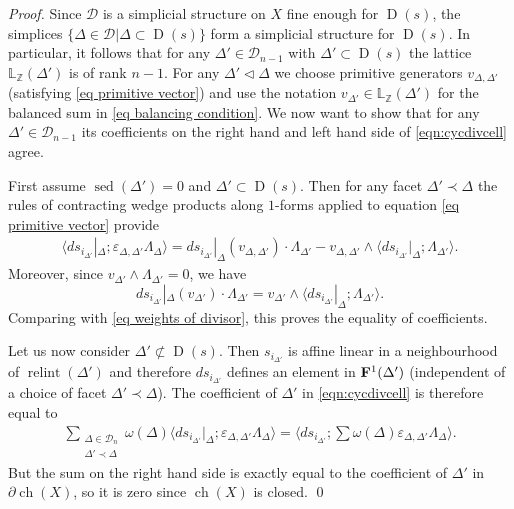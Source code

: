 \documentclass[11pt]{article}
\numberwithin{equation}{numsection}
\newcommand{\Z}{{\mathbb Z}}
\renewcommand{\D}{{\mathcal D}}
\newcommand{\Linear}{\mathbb{L}}
\newcommand{\DD}{\mathcal{D}}
\newcommand{\diff}{d}
\newcommand{\face}{\lhd}
\DeclareMathOperator{\relint}{relint}
\DeclareMathOperator{\sed}{sed}
\DeclareMathOperator{\ch}{ch}
\DeclareMathOperator{\ND}{D}
\begin{document}
\begin{proof}
Since $\DD$ is a simplicial structure on $X$ fine enough for $\ND(s)$, the simplices $\{\Delta \in \DD | \Delta \subset \ND(s)\}$
form a simplicial structure for $\ND(s)$. 
In particular, it follows that for any $\Delta' \in \DD_{n-1}$ with 
$\Delta' \subset \ND(s)$ the lattice $\Linear_{\Z}(\Delta')$ is of rank $n-1$. 
For any $\Delta' \face \Delta$ we choose primitive generators $v_{\Delta, \Delta'}$ (satisfying
\eqref{eq primitive vector}) and use the notation $v_{\Delta'} \in \Linear_{\Z}(\Delta')$ for the balanced sum in \eqref{eq balancing condition}.
We now want to show that for any $\Delta' \in \D_{n-1}$ its coefficients 
on the right hand and left hand side of \eqref{eqn:cycdivcell} agree.

First assume $\sed(\Delta') = 0$ and $\Delta' \subset \ND(s)$.
Then for any facet $\Delta' \prec \Delta$ 
the rules of contracting wedge products along $1$-forms 
applied to equation \eqref{eq primitive vector} provide
\begin{align}\label{eqn:contract}
\langle \diff s_{i_{\Delta'}}|_{\Delta}; \varepsilon_{\Delta, \Delta'} \Lambda_{\Delta} \rangle = 
\diff s_{i_{\Delta'}}|_{\Delta}(v_{\Delta, \Delta'}) \cdot \Lambda_{\Delta'} - 
 v_{\Delta, \Delta'} \wedge \langle \diff s_{i_{\Delta'}}|_{\Delta}; \Lambda_{\Delta'} \rangle.
\end{align}
Moreover, since $v_{\Delta'} \wedge \Lambda_{\Delta'} = 0$, we have
\[
  \diff s_{i_{\Delta'}}|_{\Delta}(v_{\Delta'}) \cdot \Lambda_{\Delta'} = 
v_{\Delta'} \wedge \langle \diff s_{i_{\Delta'}}|_{\Delta}; \Lambda_{\Delta'} \rangle.
\]
Comparing with \eqref{eq weights of divisor}, this proves the equality of coefficients.


Let us now consider $\Delta' \not\subset \ND(s)$. 
Then $s_{i_{\Delta'}}$ is affine linear in a neighbourhood of $\relint(\Delta')$ and 
therefore $\diff s_{i_{\Delta'}}$ defines an element
in ${\bf F}^1(\Delta')$ (independent of a choice of facet $\Delta' \prec \Delta$). 
The coefficient of $\Delta'$ in \eqref{eqn:cycdivcell} is therefore equal to 
\begin{align*}  
\sum_{\substack{\Delta \in \DD_{n} \\ \Delta' \prec \Delta}}
\omega(\Delta)  \langle \diff s_{i_{\Delta'}}|_{\Delta}; \varepsilon_{\Delta, \Delta'} \Lambda_\Delta \rangle = 
\langle \diff s_{i_{\Delta'}}; \sum \omega(\Delta) \varepsilon_{\Delta, \Delta'} \Lambda_\Delta \rangle.
\end{align*}
But the sum on the right hand side is exactly equal to the coefficient of $\Delta'$ in $\partial \ch(X)$, so 
it is zero since $\ch(X)$ is closed. \qed
\end{proof}
\end{document}
